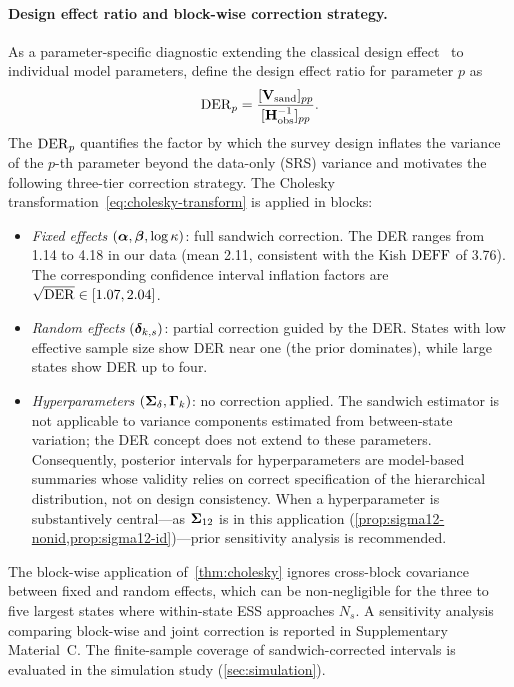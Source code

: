 \paragraph{Design effect ratio and block-wise correction strategy.}
As a parameter-specific diagnostic extending the classical design
effect~\citep{RaoScott1981, PfeffermannEtAl1998} to individual model
parameters, define the design effect ratio for parameter $p$ as
\begin{equation}\label{eq:der}
  \operatorname{DER}_{p}
  = \frac{[\mathbf{V}_{\mathrm{sand}}]_{pp}}{[\mathbf{H}_{\mathrm{obs}}^{-1}]_{pp}}.
\end{equation}
The $\operatorname{DER}_p$ quantifies the factor by which the survey design inflates
the variance of the $p$-th parameter beyond the data-only (SRS) variance
and motivates the following three-tier correction strategy.
The Cholesky transformation~\eqref{eq:cholesky-transform} is applied
in blocks:
\begin{itemize}[nosep]
  \item \emph{Fixed effects} $(\boldsymbol{\alpha}, \boldsymbol{\beta}, \log\kappa)$: full sandwich
    correction. The DER ranges from 1.14 to 4.18 in our data
    (mean 2.11, consistent with the Kish $\text{DEFF}$ of 3.76). The corresponding
    confidence interval inflation factors are
    $\sqrt{\operatorname{DER}} \in [1.07, 2.04]$.
  \item \emph{Random effects} $(\boldsymbol{\delta}_{k,s})$: partial correction guided by
    the DER. States with low effective sample size show DER near one (the prior
    dominates), while large states show DER up to four.
  \item \emph{Hyperparameters} $(\boldsymbol{\Sigma}_\delta, \boldsymbol{\Gamma}_k)$: no correction
    applied. The sandwich estimator is not applicable to variance components
    estimated from between-state variation; the DER concept does not extend to
    these parameters. Consequently, posterior intervals for hyperparameters are
    model-based summaries whose validity relies on correct specification of the
    hierarchical distribution, not on design consistency. When a hyperparameter
    is substantively central---as $\boldsymbol{\Sigma}_{12}$ is in this
    application (\cref{prop:sigma12-nonid,prop:sigma12-id})---prior
    sensitivity analysis is recommended.
\end{itemize}

\begin{remark}\label{rem:blockwise}
  The block-wise application of~\cref{thm:cholesky} ignores cross-block
  covariance between fixed and random effects, which can be non-negligible
  for the three to five largest states where within-state ESS approaches $N_s$.
  A sensitivity analysis comparing block-wise and joint correction is reported
  in Supplementary Material~C.  The finite-sample coverage of sandwich-corrected
  intervals is evaluated in the simulation study (\cref{sec:simulation}).
\end{remark}


